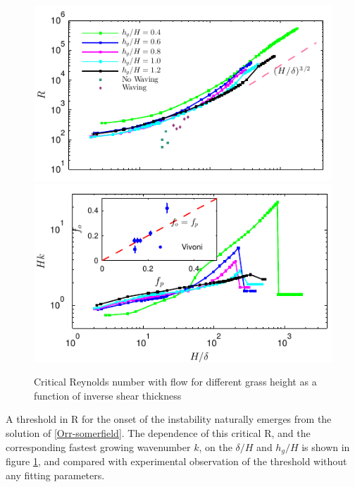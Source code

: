 \documentclass[aps,prl,twocolumn,showpacs,superscriptaddress,groupedaddress,10pt]{revtex4-1}  %
\newcommand{\hg}{h_g}
\newcommand{\Rey}{\text{R}}
\begin{document}
\begin{figure}[htb]
\begin{center}
\includegraphics[]{Critical_Re_vs_delta_noshear} \\
\vspace{-6mm} \hspace{-3mm}
\includegraphics[]{K_vs_shear_width_noshear}
\end{center}
\caption{Critical Reynolds number with flow for different grass height as a function of inverse shear thickness}
\label{Re_vs_delta}
\end{figure}

A threshold in $\Rey$ for the onset of the instability naturally emerges from the solution of \eqref{Orr-somerfield}. The dependence of this critical $\Rey$, and the corresponding fastest growing wavenumber $k$, on the $\delta/H$ and $\hg/H$ is shown in figure \ref{Re_vs_delta}, and compared with experimental observation of the threshold\cite{Ghisal02} without any fitting parameters. 
\end{document}
